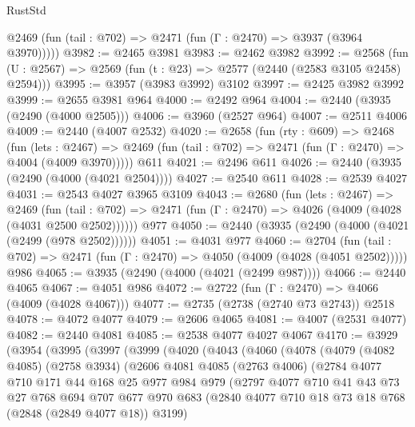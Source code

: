\begin{lexlean}{RustStd}
\begin{coremodule}
      @2469 (fun (tail : @702) => @2471 (fun (Γ : @2470) => @3937 (@3964 @3970)))))
@3982 := @2465 @3981
@3983 := @2462 @3982
@3992 := @2568 (fun (U : @2567) => @2569 (fun (t : @23) => @2577 (@2440 (@2583 @3105 @2458) @2594)))
@3995 := @3957 (@3983 @3992) @3102
@3997 := @2425 @3982 @3992
@3999 := @2655 @3981 @964
@4000 := @2492 @964
@4004 := @2440 (@3935 (@2490 (@4000 @2505)))
@4006 := @3960 (@2527 @964)
@4007 := @2511 @4006
@4009 := @2440 (@4007 @2532)
@4020 := @2658
    (fun (rty : @609) =>
    @2468
      (fun (lets : @2467) =>
      @2469 (fun (tail : @702) => @2471 (fun (Γ : @2470) => @4004 (@4009 @3970)))))
    @611
@4021 := @2496 @611
@4026 := @2440 (@3935 (@2490 (@4000 (@4021 @2504))))
@4027 := @2540 @611
@4028 := @2539 @4027
@4031 := @2543 @4027 @3965 @3109
@4043 := @2680
    (fun (lets : @2467) =>
    @2469
      (fun (tail : @702) => @2471 (fun (Γ : @2470) => @4026 (@4009 (@4028 (@4031 @2500 @2502))))))
    @977
@4050 := @2440 (@3935 (@2490 (@4000 (@4021 (@2499 (@978 @2502))))))
@4051 := @4031 @977
@4060 := @2704
    (fun (tail : @702) => @2471 (fun (Γ : @2470) => @4050 (@4009 (@4028 (@4051 @2502)))))
    @986
@4065 := @3935 (@2490 (@4000 (@4021 (@2499 @987))))
@4066 := @2440 @4065
@4067 := @4051 @986
@4072 := @2722 (fun (Γ : @2470) => @4066 (@4009 (@4028 @4067)))
@4077 := @2735 (@2738 (@2740 @73 @2743)) @2518
@4078 := @4072 @4077
@4079 := @2606 @4065
@4081 := @4007 (@2531 @4077)
@4082 := @2440 @4081
@4085 := @2538 @4077 @4027 @4067
@4170 := @3929
    (@3954
      (@3995
        (@3997
          (@3999
            (@4020
              (@4043
                (@4060
                  (@4078
                    (@4079
                      (@4082 @4085)
                      (@2758 @3934)
                      (@2606
                        @4081
                        @4085
                        (@2763 @4006)
                        (@2784
                          @4077
                          @710
                          @171
                          @44
                          @168
                          @25
                          @977
                          @984
                          @979
                          (@2797
                            @4077
                            @710
                            @41
                            @43
                            @73
                            @27
                            @768
                            @694
                            @707
                            @677
                            @970
                            @683
                            (@2840 @4077 @710 @18 @73 @18 @768 (@2848 (@2849 @4077 @18)) @3199)

\end{coremodule}
\end{lexlean}
